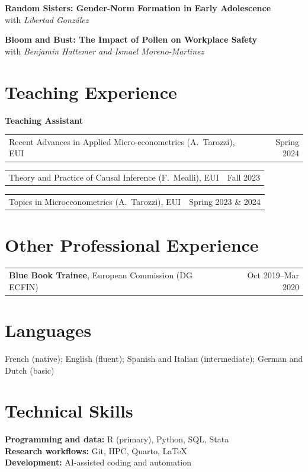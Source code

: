 \documentclass[10pt,a4paper]{article}
\makeatletter
\newcommand{\entry}[2]{%
  \begin{tabularx}{\textwidth}{@{}>{\raggedright\arraybackslash}X@{\hspace{5mm}}r@{}}
    #1 & #2
  \end{tabularx}\par
}
\makeatother
\begin{document}
\textbf{Random Sisters: Gender-Norm Formation in Early Adolescence}\\
with \textit{Libertad Gonz\'alez}
\par\vspace{8pt}

\textbf{Bloom and Bust: The Impact of Pollen on Workplace Safety}\\
with \textit{Benjamin Hattemer and Ismael Moreno-Martinez}

\section*{Teaching Experience}

\textbf{Teaching Assistant}
\par\vspace{4pt}
\entry{Recent Advances in Applied Micro-econometrics (A.~Tarozzi), EUI}{Spring 2024}
\par\vspace{3pt}
\entry{Theory and Practice of Causal Inference (F.~Mealli), EUI}{Fall 2023}
\par\vspace{3pt}
\entry{Topics in Microeconometrics (A.~Tarozzi), EUI}{Spring 2023 \& 2024}

\section*{Other Professional Experience}

\entry{\textbf{Blue Book Trainee}, European Commission (DG ECFIN)}{Oct 2019--Mar 2020}

\section*{Languages}

French (native); English (fluent); Spanish and Italian (intermediate);
German and Dutch (basic)

\section*{Technical Skills}

\textbf{Programming and data:} R (primary), Python, SQL, Stata\\
\textbf{Research workflows:} Git, HPC, Quarto, \LaTeX{}\\
\textbf{Development:} AI-assisted coding and automation
\end{document}
